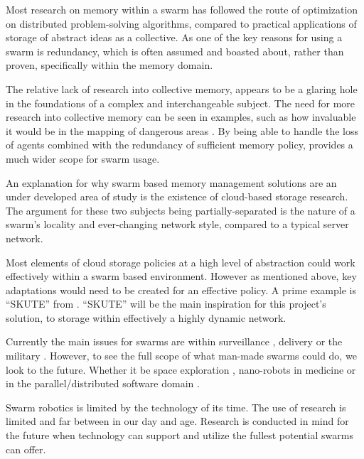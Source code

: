 \documentclass{UoYCSproject}
\begin{document}
Most research on memory within a swarm has followed the route of optimization on distributed problem-solving algorithms, compared to practical applications of storage of abstract ideas as a collective.
As one of the key reasons for using a swarm is redundancy, which is often assumed and boasted about, rather than proven, specifically within the memory domain.

The relative lack of research into collective memory, appears to be a glaring hole in the foundations of a complex and interchangeable subject.
The need for more research into collective memory can be seen in examples, such as how invaluable it would be in the mapping of dangerous areas \cite{Cognitive maps mine detection}.
By being able to handle the loss of agents combined with the redundancy of sufficient memory policy, provides a much wider scope for swarm usage.

An explanation for why swarm based memory management solutions are an under developed area of study is the existence of cloud-based storage research.
The argument for these two subjects being partially-separated is the nature of a swarm's locality and ever-changing network style, compared to a typical server network.


Most elements of cloud storage policies at a high level of abstraction could work effectively within a swarm based environment.
However as mentioned above, key adaptations would need to be created for an effective policy.
A prime example is “SKUTE” from \cite{Distributed Storage}.
“SKUTE” will be the main inspiration for this project's solution, to storage within effectively a highly dynamic network.

Currently the main issues for swarms are within surveillance \cite{UAV, HiveMind}, delivery or the military \cite{Swarm robotics reviewed}.
However, to see the full scope of what man-made swarms could do, we look to the future.
Whether it be space exploration \cite{Space exploration}, nano-robots in medicine or in the parallel/distributed software domain \cite{blockchainandSwarm}.

Swarm robotics is limited by the technology of its time.
The use of research is limited and far between in our day and age.
Research is conducted in mind for the future when technology can support and utilize the fullest potential swarms can offer.







\end{document}
